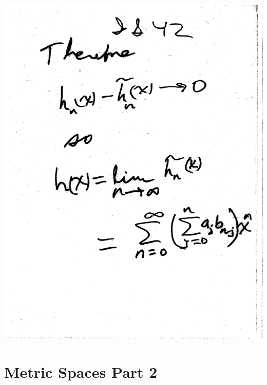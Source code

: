 \documentclass[10pt,a4paper]{article}
\begin{document}
\includegraphics[scale=.5]{Pages/IS_42}


\section{Metric Spaces Part 2}




\end{document}
